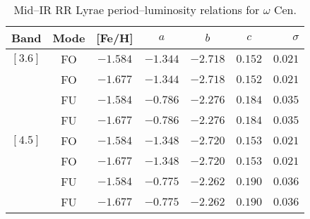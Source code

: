 \begin{table}
\centering
\caption{Mid--IR RR Lyrae period--luminosity relations for $\omega$ Cen.} 
\label{tab:pl_table}
\begin{tabular}{l|c|c|c|c|c|r} 
\hline \hline
Band & Mode  & [Fe/H]  & $a$   & $b$   & $c$   & $\sigma$ \\
\hline
$[3.6]$ & FO & $-1.584$ & $-1.344$ & $-2.718$ & $0.152$ & $0.021$ \\
            & FO & $-1.677$ & $-1.344$ & $-2.718$ & $0.152$ & $0.021$ \\
            & FU & $-1.584$ & $-0.786$ & $-2.276$ & $0.184$ & $0.035$ \\
            & FU & $-1.677$ & $-0.786$ & $-2.276$ & $0.184$ & $0.035$ \\
$[4.5]$ & FO & $-1.584$ & $-1.348$ & $-2.720$ & $0.153$ & $0.021$ \\         
            & FO & $-1.677$ & $-1.348$ & $-2.720$ & $0.153$ & $0.021$ \\         
            & FU & $-1.584$ & $-0.775$ & $-2.262$ & $0.190$ & $0.036$ \\
            & FU & $-1.677$ & $-0.775$ & $-2.262$ & $0.190$ & $0.036$ \\
            \hline
\end{tabular}
\end{table}
